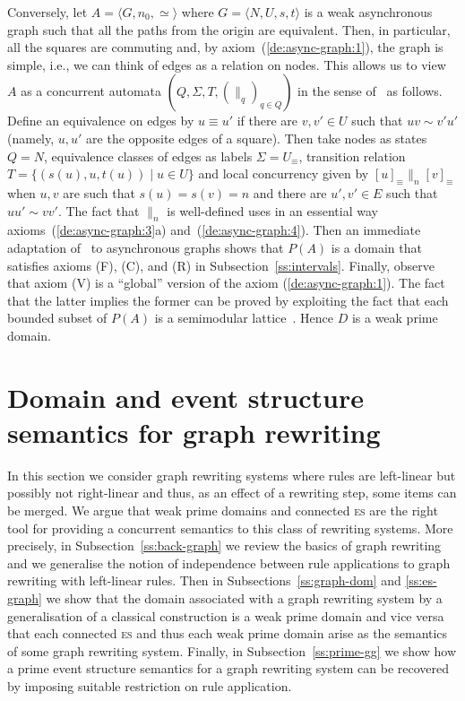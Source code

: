 \documentclass[conference]{IEEEtran}
\renewenvironment{proof}{\begin{IEEEproof}}{\end{IEEEproof}}
\newcommand{\esabbr}{\textsc{es}}
\newcommand{\eqclass}[2][]{\ensuremath{[{#2}]_{\scriptscriptstyle {#1}}}}
\newcommand{\quotient}[2]{\ensuremath{{#1}_{\scriptscriptstyle {#2}}}}
\begin{document}
\begin{proof}
  \bigskip
  
  Conversely, let $A = \langle G, n_0, \simeq \rangle$ where
  $G = \langle N, U, s, t \rangle$ is a weak asynchronous graph such that
  all the paths from the origin are equivalent. Then, in particular, all
  the squares are commuting and, by axiom~(\ref{de:async-graph:1}), the
  graph is simple, i.e., we can think of edges as a relation on
  nodes.
  This allows us to view $A$ as a concurrent automata
  $(Q,\Sigma, T, (\parallel_q)_{q \in Q})$ in the sense
  of~\cite{Dro:CAD} as follows. Define an equivalence on edges by
  $u \equiv u'$ if there are $v, v' \in U$ such that $u v \sim v'u'$
  (namely, $u, u'$ are the opposite edges of a square). Then take
  nodes as states $Q = N$, equivalence classes of edges as labels
  $\Sigma = \quotient{U}{\equiv}$, transition relation
  $T = \{ (s(u), u, t(u)) \mid u \in U \}$ and local concurrency given
  by $\eqclass[\equiv]{u} \parallel_n \eqclass[\equiv]{v}$ when $u, v$ are such that
  $s(u)=s(v)=n$ and there are $u', v' \in E$ such that $uu' \sim v v'$.
  The fact that $\parallel_n$ is well-defined uses in an essential way
  axioms~(\ref{de:async-graph:3}a) and~(\ref{de:async-graph:4}).  Then an immediate adaptation
  of~\cite[Theorem 10]{Dro:CAD} to asynchronous graphs shows that
  $P(A)$ is a domain that satisfies axioms (F), (C), and (R) in
  Subsection~\ref{ss:intervals}. Finally, observe that axiom (V) is a
  ``global'' version of the axiom (\ref{de:async-graph:1}). The fact
  that the latter implies the former can be proved by exploiting the
  fact that each bounded subset of $P(A)$ is a semimodular lattice~\cite[Theorem 3.1]{DK:ACRS}. 
  Hence $D$ is a weak prime domain.
\end{proof}



\section{Domain and event structure semantics for graph rewriting}
\label{se:graphs}

In this section we consider graph rewriting systems where rules are
left-linear but possibly not right-linear and thus, as an effect of a
rewriting step, some items can be merged. We argue that weak prime
domains and connected {\esabbr} are the right tool for providing a
concurrent semantics to this class of rewriting systems. More
precisely, in Subsection~\ref{ss:back-graph} we review the basics of
graph rewriting and we generalise the notion of independence between
rule applications to graph rewriting with left-linear rules.  Then in
Subsections~\ref{ss:graph-dom} and \ref{ss:es-graph} we show that the
domain associated with a graph rewriting system by a generalisation of
a classical construction is a weak prime domain and vice versa that
each connected {\esabbr} and thus each weak prime domain arise as the
semantics of some graph rewriting system. Finally, in
Subsection~\ref{ss:prime-gg} we show how a prime event structure
semantics for a graph rewriting system can be recovered by imposing
suitable restriction on rule application.
\end{document}
